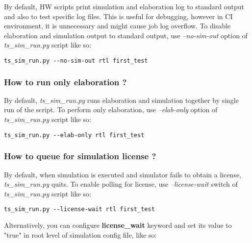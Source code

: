 \documentclass{tropic_design_spec}
\begin{document}
By default, HW scripts print simulation and elaboration log to standard output and also
to test specific log files. This is useful for debugging, however in CI environment,
it is unnecessary and might cause job log overflow. To disable elaboration
and simulation output to standard output, use \textit{--no-sim-out} option
of \textit{ts_sim_run.py} script like so:

\begin{lstlisting}
ts_sim_run.py --no-sim-out rtl first_test
\end{lstlisting}


\subsubsection{How to run only elaboration ?}
\label{sec:how-to-run-only-elaboration}

By default, \textit{ts_sim_run.py} runs elaboration and simulation together by single
run of the script. To perform only elaboration, use \textit{--elab-only} option of
\textit{ts_sim_run.py} script like so:

\begin{lstlisting}
ts_sim_run.py --elab-only rtl first_test
\end{lstlisting}


\subsubsection{How to queue for simulation license ?}
\label{sec:how-to-queue-for-simulation-license}

By default, when simulation is executed and simulator fails to obtain a license,
\textit{ts_sim_run.py} quits. To enable polling for license, use \textit{--license-wait}
switch of \textit{ts_sim_run.py} script like so:

\begin{lstlisting}
ts_sim_run.py --license-wait rtl first_test
\end{lstlisting}

Alternatively, you can configure \textbf{license_wait} keyword and set its value to
"true" in root level of simulation config file, like so:
\end{document}
